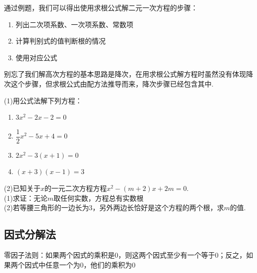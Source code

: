 \documentclass[lang=cn, 10pt, titlestyle=hang, oneside]{elegantbook}
\begin{document}
通过例题，我们可以得出使用求根公式解二元一次方程的步骤：
\begin{enumerate}
    \item 列出二次项系数、一次项系数、常数项
    \item 计算判别式的值判断根的情况
    \item 使用对应公式
\end{enumerate}
\par
别忘了我们解高次方程的基本思路是降次，在用求根公式解方程时虽然没有体现降次这个步骤，但求根公式由配方法推导而来，降次步骤已经包含其中.
\begin{exercise}
\setlength{\parindent}{0pt} %
\setlength{\columnseprule}{0.01pt}
\begin{multicols}{2}
    (1)用公式法解下列方程：
    \begin{enumerate}
        \item \(3x^2-2x-2=0\)
        \item \(\dfrac{1}{2}x^2-5x+4=0\)
        \item \(2x^2-3(x+1)=0\)
        \item \((x+3)(x-1)=3\)
    \end{enumerate}
    (2)已知关于\(x\)的一元二次方程方程\(x^2-(m+2)x+2m=0\).\\
    (1)求证：无论\(m\)取任何实数，方程总有实数根\\
    (2)若等腰三角形的一边长为3，另外两边长恰好是这个方程的两个根，求\(m\)的值.
\end{multicols}
\end{exercise}

\subsection{因式分解法}

\begin{property}
    零因子法则：如果两个因式的乘积是0，则这两个因式至少有一个等于0；反之，如果两个因式中任意一个为0，他们的乘积为0
\end{property}
\end{document}
